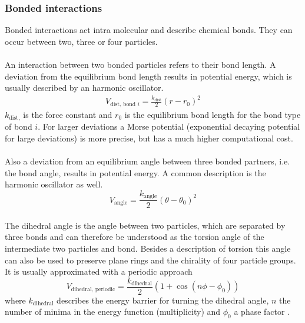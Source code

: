 \subsubsection{Bonded interactions}
Bonded interactions act intra molecular and describe chemical bonds. They can occur between two, three or four particles.\\
\\
An interaction between two bonded particles refers to their bond length. A deviation from the equilibrium bond length results in potential energy, which is usually described by an harmonic oscillator.
\begin{align}
V_{\text{dist, bond }i} = \frac{k_{\text{dist}}}{2}\left( r - r_{0} \right)^2
\end{align}
$k_{\text{dist,}}$ is the force constant and $r_0$ is the equilibrium bond length for the bond type of bond $i$. For larger deviations a Morse potential (exponential decaying potential for large deviations) is more precise, but has a much higher computational cost.\\
\\
Also a deviation from an equilibrium angle between three bonded partners, i.e. the bond angle, results in potential energy. A common description is the harmonic oscillator as well.
\begin{equation}
V_\text{angle} = \frac{k_\text{angle}}{2}\left( \theta - \theta_0 \right)^2
\end{equation}%
\\
The dihedral angle is the angle between two particles, which are separated by three bonds and can therefore be understood as the torsion angle of the intermediate two particles and bond. Besides a description of torsion this angle can also be used to preserve plane rings and the chirality of four particle groups. It is usually approximated with a periodic approach
\begin{equation}
V_{\text{dihedral, periodic}} = \frac{k_\text{dihedral}}{2}\left(1 + \cos\left(n \phi - \phi_0 \right)\right)
\end{equation}
where $k_\text{dihedral}$ describes the energy barrier for turning the dihedral angle, $n$ the number of minima in the energy function (multiplicity) and $\phi_0$ a phase factor \autocite[p. 71-83]{gromacsManual}.
